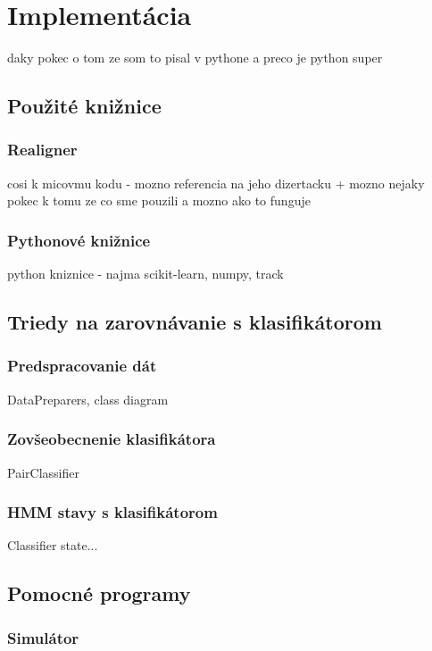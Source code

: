 \chapter{Implementácia}

\todo daky pokec o tom ze som to pisal v pythone a preco je python super

\section{Použité knižnice}

\subsection{Realigner}
\todo cosi k micovmu kodu - mozno referencia na jeho dizertacku + mozno nejaky pokec k tomu ze co sme pouzili a mozno ako to funguje

\subsection{Pythonové knižnice}
\todo python kniznice - najma scikit-learn, numpy, track

\section{Triedy na zarovnávanie s klasifikátorom}

\subsection{Predspracovanie dát}

\todo DataPreparers, class diagram

\subsection{Zovšeobecnenie klasifikátora}

\todo PairClassifier

\subsection{HMM stavy s klasifikátorom}

\todo Classifier state...

\section{Pomocné programy}
\subsection{Simulátor}

